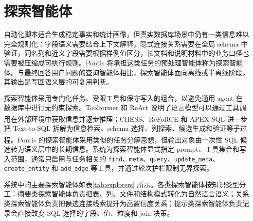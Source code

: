 \documentclass[
    bachelor,
    pdflinks,
]{xjtuthesis}
\newcommand{\upcite}[1]{\textsuperscript{\cite{#1}}}
\begin{document}
\section{探索智能体}

自动化脚本适合生成稳定事实和统计画像，但真实数据库场景中仍有一类信息难以完全规则化：字段语义需要结合上下文解释，隐式连接关系需要在全局 schema 中验证，同名列和近义字段需要根据样例值区分，长文档和说明材料中的业务口径也需要被压缩成可执行规则。Pontis 将承担这类任务的预处理智能体称为探索智能体。与最终回答用户问题的查询智能体相比，探索智能体面向离线或半离线阶段，其输出是写回语义层的可复用判断。

探索智能体采用专门化任务、受限工具和保守写入的组合，以避免通用 agent 在数据库中进行无约束探索。Toolformer 和 ReAct 说明了语言模型可以通过工具调用在外部环境中获取信息并逐步推理\upcite{schick2023toolformer,yao2023react}；CHESS、ReFoRCE 和 APEX-SQL 进一步把 Text-to-SQL 拆解为信息检索、schema 选择、列探索、候选生成和验证等子过程\upcite{talaei2024chess,deng2025reforce,cao2026apexsql}。Pontis 的探索智能体采用类似的任务分解思想，但输出对象由一次性 SQL 候选转为语义层中的长期信息。系统为探索智能体显式指定 prompt、工具集合和写入范围，通常只启用与任务相关的 \texttt{find}、\texttt{meta}、\texttt{query}、\texttt{update\_meta}、\texttt{create\_entity} 和 \texttt{add\_edge} 等工具，并通过轮次护栏限制无界探索。

系统中的主要探索智能体如表\ref{tab:explorers} 所示。各类探索智能体按知识类型分工：摘要类探索智能体负责把表、列、文件和结构模式转化为自然语言语义；关系类探索智能体负责把候选连接线索提升为高置信度关系；提示类探索智能体负责记录会直接改变 SQL 选择的字段、值、粒度和 join 决策。
\end{document}
